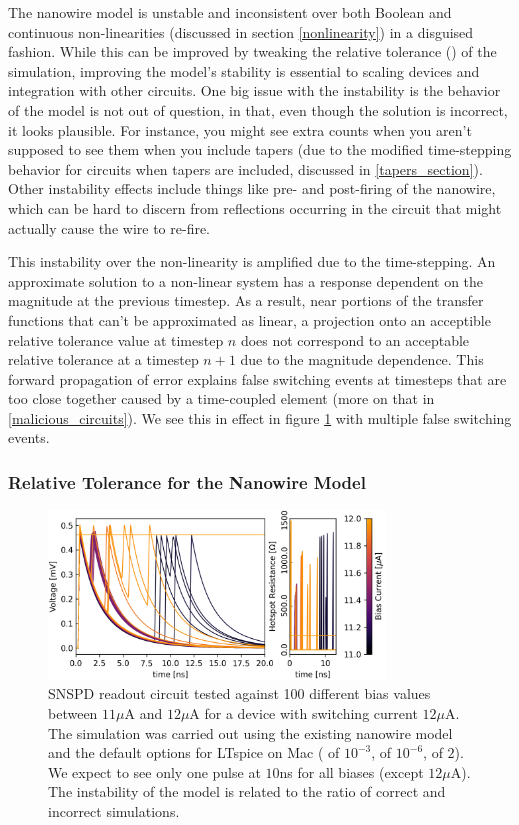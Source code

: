 The nanowire model is unstable and inconsistent over both Boolean and continuous non-linearities (discussed in section \ref{nonlinearity}) in a disguised 
fashion. While this can be improved by tweaking the relative tolerance () 
of the simulation, improving the model's stability is essential to scaling devices and integration 
with other circuits.
One big issue with the instability is the behavior of the model is not out of question, in that,
even though the solution is incorrect, it looks plausible. For instance, you might see extra counts
when you aren't supposed to see them when you include tapers (due to the modified time-stepping behavior
for circuits when tapers are included, discussed in \ref{tapers_section}). Other instability effects
include things like pre- and post-firing of the nanowire, which can be hard to discern from reflections
occurring in the circuit that might actually cause the wire to re-fire.

This instability over the non-linearity is amplified due to the time-stepping. An approximate 
solution to a non-linear system has a response dependent on the magnitude at the previous timestep. 
As a result,
near portions of the transfer functions that can't be approximated as linear, a projection
onto an acceptible relative tolerance value at timestep $n$ does not correspond to an
acceptable relative tolerance at a timestep $n+1$ due to the magnitude dependence.
This forward propagation of error explains false switching events at timesteps that
are too close together caused by a time-coupled element (more on that in \ref{malicious_circuits}).
We see this in effect in figure \ref{fig:sweepbias} with multiple false switching events.

\subsubsection{Relative Tolerance for the Nanowire Model} \label{reltol}

\begin{figure}
    \centering
    \includegraphics[width=0.8\textwidth]{figs/jumbled_mess_new.png}
    \caption{SNSPD readout circuit tested against 100 different bias values between
    $11\mu$A and $12\mu$A for a device with switching current $12\mu$A. The simulation
    was carried out using the existing nanowire model and the default options for LTspice
    on Mac ( of $10^{-3}$,  of $10^{-6}$,  of $2$). 
    We expect to see only
    one pulse at $10$ns for all biases (except $12\mu$A). The instability of the model is
    related to the ratio of correct and incorrect simulations.}
    \label{fig:sweepbias}
\end{figure}

